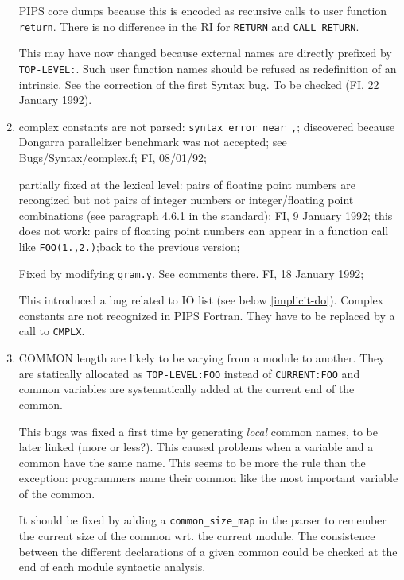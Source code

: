 \begin{enumerate}
        PIPS core dumps because this is encoded as recursive calls to
        user function \verb+return+. There is no difference in the RI
        for \verb+RETURN+ and \verb+CALL RETURN+.

        This may have now changed because external names are directly prefixed
        by \verb+TOP-LEVEL:+. Such user function names should
        be refused as redefinition of an intrinsic. 
        See the correction of the first Syntax bug.
        To be checked (FI, 22 January 1992).

  \item \label{complex-constant}
        complex constants are not parsed: \verb+syntax error near ,+;
        discovered because Dongarra parallelizer benchmark was not
        accepted; see Bugs/Syntax/complex.f; FI, 08/01/92; 

        partially fixed at the lexical level: pairs of floating point
        numbers are recongized but not pairs of integer numbers or
        integer/floating point combinations (see paragraph 4.6.1 in
        the standard); FI, 9 January 1992; this does not work: pairs
        of floating point numbers can appear in a function call like
        \verb+FOO(1.,2.)+;back
        to the previous version;

        Fixed by modifying \verb+gram.y+. See comments there.
        FI, 18 January 1992;

        This introduced a bug related to IO list (see below
        \ref{implicit-do}). Complex
        constants are not recognized in PIPS Fortran. They have to
        be replaced by a call to \verb+CMPLX+.

  \item COMMON length are likely to be varying from a module to another.
        They are statically allocated as \verb+TOP-LEVEL:FOO+ instead
        of \verb+CURRENT:FOO+ and common variables are systematically
        added at the current end of the common.

        This bugs was fixed a first time by generating {\em local}
        common names, to be later linked (more or less?). This caused
        problems when a variable and a common have the same name. This
        seems to be more the rule than the exception: programmers
        name their common like the most important variable of the
        common.

        It should be fixed by adding a \verb+common_size_map+ in the
        parser to remember the current size of the common wrt. the
        current module. The consistence between the different
        declarations of a given common could be checked at the
        end of each module syntactic analysis.


\end{enumerate}
